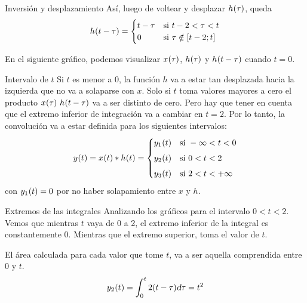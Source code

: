\begin{mdframed}[style=ExampleFrame]
\begin{numset}
\begin{numitem}{Inversión y desplazamiento}
            Así, luego de voltear y desplazar $\fx[h]{\tau}$, queda
            \[
                \fx[h]{t-\tau}
                =
                \begin{cases}
                    t-\tau & \text{si } t - 2 < \tau < t
                    \\
                    0 & \text{si } \tau \notin [t - 2;t]
                \end{cases}
            \]

            En el siguiente gráfico, podemos visualizar $\fx[x]{\tau}$, $\fx[h]{\tau}$ y $\fx[h]{t-\tau}$ cuando $t=0$.
            \begin{center}
                \def\svgwidth{0.9\linewidth}
                
            \end{center}
        \end{numitem}

        \begin{numitem}{Intervalo de $t$}
            Si $t$ es menor a 0, la función $h$ va a estar tan desplazada hacia la izquierda que no va a solaparse con $x$.
            Solo si $t$ toma valores mayores a cero el producto $\fx[x]{\tau} \, \fx[h]{t - \tau}$ va a ser distinto de cero.
            Pero hay que tener en cuenta que el extremo inferior de integración va a cambiar en $t = 2$.
            Por lo tanto, la convolución va a estar definida para los siguientes intervalos:
            \[
                \fx[y]{t} = \fx[x]{t} * \fx[h]{t} =
                \begin{cases}
                    \fx[y_1]{t} & \text{si } -\infty < t < 0
                    \\[1ex]
                    \fx[y_2]{t} & \text{si } 0 < t < 2
                    \\[1ex]
                    \fx[y_3]{t} & \text{si } 2 < t < +\infty
                \end{cases}
            \]
            con $\fx[y_1]{t} = 0$ por no haber solapamiento entre $x$ y $h$.
        \end{numitem}

        \begin{numitem}{Extremos de las integrales}
            Analizando los gráficos para el intervalo $0 < t < 2$.
            Vemos que mientras $t$ vaya de 0 a 2, el extremo inferior de la integral es constantemente 0.
            Mientras que el extremo superior, toma el valor de $t$.
            
            El área calculada para cada valor que tome $t$, va a ser aquella comprendida entre 0 y $t$.
            \[
                \fx[y_2]{t}
                = \int_0^t 2 (t - \tau) \dif \tau
                = t^2
            \]


\end{numitem}
\end{numset}
\end{mdframed}
